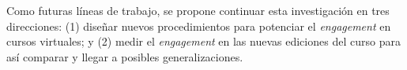 \documentclass{textolivre}
\begin{document}
Como futuras líneas de trabajo, se propone continuar esta investigación en tres direcciones: (1) diseñar nuevos procedimientos para potenciar el \emph{engagement} en cursos virtuales; y (2)  medir el \emph{engagement} en las nuevas ediciones del curso para así comparar y llegar a posibles generalizaciones.


\printbibliography\label{sec-bib}
\end{document}
